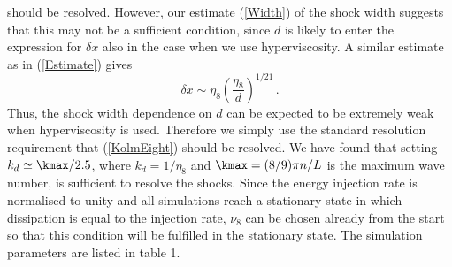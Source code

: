 should be resolved. However, our estimate (\ref{Width}) of the shock width suggests that this may not be a sufficient condition, since $ d $ is likely to enter the expression for $ \delta x $ also in the case when we use hyperviscosity.
A similar estimate as in (\ref{Estimate}) gives
\begin{equation} \label{EtaEight}
\delta x \sim \eta_{8} \left ( \frac{\eta_8}{d} \right)^{1/21} \, .
\end{equation} 
Thus, the shock width dependence on $ d $ can be expected to be extremely weak when hyperviscosity is used. Therefore we simply use the standard resolution requirement that (\ref{KolmEight}) should be resolved. We have found that setting
$  k_{d} \simeq \kmax/ 2.5$, where $ k_{d} = 1/\eta_8 $ and $\kmax =
(8/9)\pi n/L $ is the maximum wave number, is  sufficient to resolve the shocks. Since the energy injection rate is normalised to unity and all simulations reach a stationary state in which dissipation is equal to the injection rate, $ \nu_8 $ can be chosen already from the start so that this condition will be fulfilled in the stationary state. 
 The  simulation parameters are listed in table 1.

